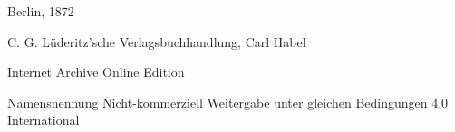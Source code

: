 \documentclass[a4paper, 11pt, oneside, english]{article}
\begin{document}
\begin{titlepage}
	\vspace*{\fill}%


	{Berlin, 1872} %
 
        {\small C. G. Lüderitz'sche Verlagsbuchhandlung, Carl Habel}

	\vspace{1\baselineskip} %

    Internet Archive Online Edition  %
	
	{\small Namensnennung Nicht-kommerziell Weitergabe unter gleichen Bedingungen 4.0 International } %
\end{titlepage}
\clearpage
\setlength{\parskip}{1mm plus1mm minus1mm}
\paragraph{}
\end{document}
